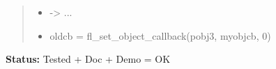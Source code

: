 \begin{boxedminipage}{\funcwidth}
\begin{quote}
\begin{itemize}
  \item {\textbar}-{\textgreater}{\textbar} ...



  \item oldcb = fl\_set\_object\_callback(pobj3, myobjcb, 0)



\end{itemize}

\end{quote}

\textbf{Status:} Tested + Doc + Demo = OK



    \end{boxedminipage}

    \label{xformslib:flbasic:fl_set_object_callback}

    \vspace{0.5ex}

